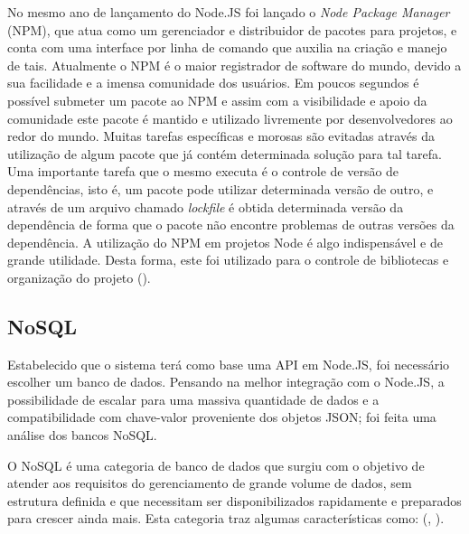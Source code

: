 \begin{enumerate}
No mesmo ano de lançamento do Node.JS foi lançado o \textit{Node Package Manager} (NPM), que atua como um gerenciador e distribuidor de pacotes para projetos, e conta com uma interface por linha de comando que auxilia na criação e manejo de tais. 
Atualmente o NPM é o maior registrador de software do mundo, devido a sua facilidade e a imensa comunidade dos usuários. 
Em poucos segundos é possível submeter um pacote ao NPM e assim com a visibilidade e apoio da comunidade este pacote é mantido e utilizado livremente por desenvolvedores ao redor do mundo. Muitas tarefas específicas e morosas são evitadas através da utilização de algum pacote que já contém determinada solução para tal tarefa.
Uma importante tarefa que o mesmo executa é o controle de versão de dependências, isto é, um pacote pode utilizar determinada versão de outro, e através de um arquivo chamado \textit{lockfile} é obtida determinada versão da dependência de forma que o pacote não encontre problemas de outras versões da dependência. A utilização do NPM em projetos Node é algo indispensável e de grande utilidade. Desta forma, este foi utilizado para o controle de bibliotecas e organização do projeto (\hspace{1sp}\cite{npm}).


\subsection{NoSQL}

Estabelecido que o sistema terá como base uma API em Node.JS, foi necessário escolher um banco de dados. Pensando na melhor integração com o Node.JS, a possibilidade de escalar para uma massiva quantidade de dados e a compatibilidade com chave-valor proveniente dos objetos JSON; foi feita uma análise dos bancos NoSQL.

O NoSQL é uma categoria de banco de dados que surgiu com o objetivo de atender aos requisitos do gerenciamento de grande volume de dados, sem estrutura definida e que necessitam ser disponibilizados rapidamente e preparados para crescer ainda mais. Esta categoria traz algumas características como: (\citeauthor{loscio2011nosql}, \citeyear{loscio2011nosql}).


\end{enumerate}
